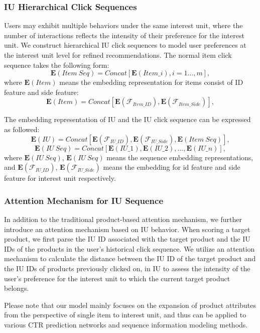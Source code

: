\subsubsection{\textbf{IU Hierarchical Click Sequences}}
Users may exhibit multiple behaviors under the same interest unit, where the number of interactions reflects the intensity of their preference for the interest unit. We construct hierarchical IU click sequences to model user preferences at the interest unit level for refined recommendations. 
The normal item click sequence takes the following form:
\begin{equation}
    \boldsymbol{E}(Item \ Seq)=
    Concat [\boldsymbol E({Item\_i}), i = 1\ldots, m],
\end{equation}
where $\boldsymbol{E}\left({Item}\right)$ means the embedding representation for items consist of ID feature and side feature:
\begin{equation}
    \boldsymbol E\left({Item}\right)=Concat [\boldsymbol E\left(\mathcal{F}_{Item\_ID}\right), \boldsymbol E\left(\mathcal{F}_{Item\_Side}\right)],
\end{equation}

The embedding representation of IU and the IU click sequence can be expressed as followed:
\begin{equation}
    \boldsymbol{E}\left(IU\right)=
    Concat [\boldsymbol E\left(\mathcal{F}_{IU\_ID}\right), \boldsymbol E\left(\mathcal{F}_{IU\_Side}\right),
    \boldsymbol{E}\left(Item \ Seq\right)],
\end{equation}
\begin{equation}
    \boldsymbol{E}\left(IU \ Seq\right)=
    Concat [\boldsymbol E\left({IU\_1}\right), \boldsymbol E\left({IU\_2}\right), \ldots,
    \boldsymbol E\left({IU\_n}\right)],
\end{equation}
where $\boldsymbol{E}\left(IU \ Seq\right)$, $\boldsymbol{E}(IU \ Seq)$ means the sequence embedding representations, and $\boldsymbol E\left(\mathcal{F}_{IU\_ID}\right)$, $\boldsymbol E\left(\mathcal{F}_{IU\_Side}\right)$ means the embedding for id feature and side feature for interest unit respectively.

\subsubsection{\textbf{Attention Mechanism for IU Sequence}}
In addition to the traditional product-based attention mechanism, we further introduce an attention mechanism based on IU behavior. When scoring a target product, we first parse the IU ID associated with the target product and the IU IDs of the products in the user's historical click sequence. We utilize an attention mechanism to calculate the distance between the IU ID of the target product and the IU IDs of products previously clicked on, in IU to assess the intensity of the user's preference for the interest unit to which the current target product belongs.


Please note that our model mainly focuses on the expansion of product attributes from the perspective of single item to interest unit, and thus can be applied to various CTR prediction networks and sequence information modeling methods.